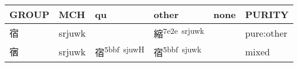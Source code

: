 \documentclass[14pt,a4paper]{scrartcl}
\begin{document}
\begin{longtable}[c]{@{}llllll@{}}
\toprule
\begin{minipage}[b]{0.14\columnwidth}\raggedright\strut
GROUP
\strut\end{minipage} &
\begin{minipage}[b]{0.14\columnwidth}\raggedright\strut
MCH
\strut\end{minipage} &
\begin{minipage}[b]{0.14\columnwidth}\raggedright\strut
qu
\strut\end{minipage} &
\begin{minipage}[b]{0.14\columnwidth}\raggedright\strut
other
\strut\end{minipage} &
\begin{minipage}[b]{0.14\columnwidth}\raggedright\strut
none
\strut\end{minipage} &
\begin{minipage}[b]{0.14\columnwidth}\raggedright\strut
PURITY
\strut\end{minipage}\tabularnewline
\midrule
\endhead
\begin{minipage}[t]{0.14\columnwidth}\raggedright\strut
宿
\strut\end{minipage} &
\begin{minipage}[t]{0.14\columnwidth}\raggedright\strut
srjuwk
\strut\end{minipage} &
\begin{minipage}[t]{0.14\columnwidth}\raggedright\strut
\strut\end{minipage} &
\begin{minipage}[t]{0.14\columnwidth}\raggedright\strut
縮\textsuperscript{7e2e~srjuwk}
\strut\end{minipage} &
\begin{minipage}[t]{0.14\columnwidth}\raggedright\strut
\strut\end{minipage} &
\begin{minipage}[t]{0.14\columnwidth}\raggedright\strut
pure:other
\strut\end{minipage}\tabularnewline
\begin{minipage}[t]{0.14\columnwidth}\raggedright\strut
㝛
\strut\end{minipage} &
\begin{minipage}[t]{0.14\columnwidth}\raggedright\strut
srjuwk
\strut\end{minipage} &
\begin{minipage}[t]{0.14\columnwidth}\raggedright\strut
宿\textsuperscript{5bbf~sjuwH}
\strut\end{minipage} &
\begin{minipage}[t]{0.14\columnwidth}\raggedright\strut
宿\textsuperscript{5bbf~sjuwk}
\strut\end{minipage} &
\begin{minipage}[t]{0.14\columnwidth}\raggedright\strut
\strut\end{minipage} &
\begin{minipage}[t]{0.14\columnwidth}\raggedright\strut
mixed
\strut\end{minipage}\tabularnewline
\bottomrule
\end{longtable}
\end{document}
